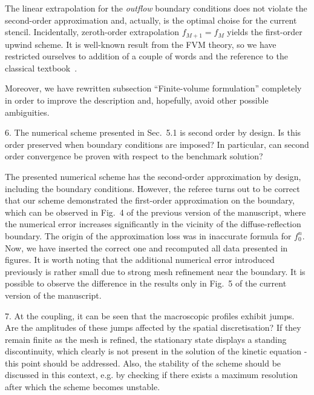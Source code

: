 \documentclass{article}
\begin{document}
The linear extrapolation for the \emph{outflow} boundary conditions
does not violate the second-order approximation
and, actually, is the optimal choise for the current stencil.
Incidentally, zeroth-order extrapolation \(f_{M+1} = f_M\) yields
the first-order upwind scheme. It is well-known result from the FVM theory,
so we have restricted ourselves to addition of a couple of words
and the reference to the classical textbook~\cite{LeVeque2002}.

Moreover, we have rewritten subsection ``Finite-volume formulation'' completely
in order to improve the description and, hopefully, avoid other possible ambiguities.

\begin{leftbar}
\end{leftbar}

\begin{quoting}
    6. The numerical scheme presented in Sec.~5.1 is
    second order by design. Is this order preserved
    when boundary conditions are imposed? In particular,
    can second order convergence be proven with respect
    to the benchmark solution?
\end{quoting}

The presented numerical scheme has the second-order approximation by design,
including the boundary conditions.
However, the referee turns out to be correct that our scheme demonstrated the first-order approximation
on the boundary, which can be observed in Fig.~4 of the previous version of the manuscript,
where the numerical error increases significantly in the vicinity of the diffuse-reflection boundary.
The origin of the approximation loss was in inaccurate formula for \(f^n_0\).
Now, we have inserted the correct one and recomputed all data presented in figures.
It is worth noting that the additional numerical error introduced previously is rather small
due to strong mesh refinement near the boundary. It is possible to observe the difference
in the results only in Fig.~5 of the current version of the manuscript.

\begin{leftbar}
\end{leftbar}

\begin{quoting}
    7. At the coupling, it can be seen that the
    macroscopic profiles exhibit jumps. Are the
    amplitudes of these jumps affected by the spatial
    discretisation? If they remain finite as the
    mesh is refined, the stationary state displays
    a standing discontinuity, which clearly is not
    present in the solution of the kinetic equation -
    this point should be addressed. Also, the stability
    of the scheme should be discussed in this context,
    e.g. by checking if there exists a maximum
    resolution after which the scheme becomes unstable.
\end{quoting}
\end{document}

